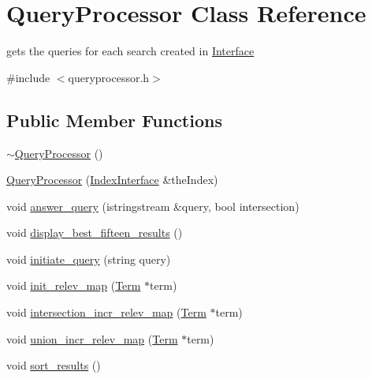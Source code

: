 \hypertarget{class_query_processor}{}\section{Query\+Processor Class Reference}
\label{class_query_processor}


gets the queries for each search created in \hyperlink{class_interface}{Interface}  




{\ttfamily \#include $<$queryprocessor.\+h$>$}

\subsection*{Public Member Functions}
\begin{DoxyCompactItemize}
\item 
\hyperlink{class_query_processor_ac4bebae67b0c08004f26f55957428574}{$\sim$\+Query\+Processor} ()
\item 
\hyperlink{class_query_processor_aadd890a58f45e11fc3eeaeb3ed34e7b4}{Query\+Processor} (\hyperlink{class_index_interface}{Index\+Interface} \&the\+Index)
\item 
void \hyperlink{class_query_processor_a95136769b295bc5a56d83a476260ed60}{answer\+\_\+query} (istringstream \&query, bool intersection)
\item 
void \hyperlink{class_query_processor_a3e93e0a00cd935ee71497623c8e6d4ad}{display\+\_\+best\+\_\+fifteen\+\_\+results} ()
\item 
void \hyperlink{class_query_processor_ae59525962d93a0087fee0afd689ce1e3}{initiate\+\_\+query} (string query)
\item 
void \hyperlink{class_query_processor_ae1f3fdd94b58ac3016ab04873145fec7}{init\+\_\+relev\+\_\+map} (\hyperlink{class_term}{Term} $\ast$term)
\item 
void \hyperlink{class_query_processor_a29d1767fe229ea175488976673463dcb}{intersection\+\_\+incr\+\_\+relev\+\_\+map} (\hyperlink{class_term}{Term} $\ast$term)
\item 
void \hyperlink{class_query_processor_aa00880b1308428b29cdc32741f82f4fc}{union\+\_\+incr\+\_\+relev\+\_\+map} (\hyperlink{class_term}{Term} $\ast$term)
\item 
void \hyperlink{class_query_processor_abb0fce31c633a5c0ae571f144f8f36f7}{sort\+\_\+results} ()
\end{DoxyCompactItemize}
